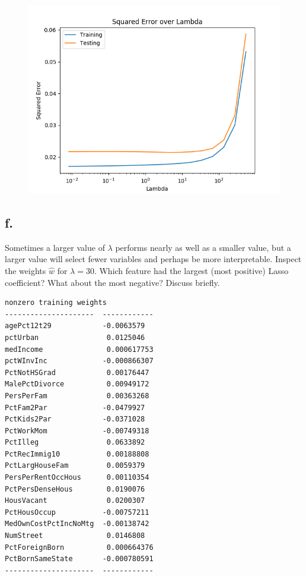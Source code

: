 \documentclass{article}
\newcommand{\1}{\mathbf{1}}
\begin{document}
{\begin{figure}[ht!]
  \centering
  \includegraphics[width=120mm]{../hw2-code/results/a5_e.png}
\end{figure}

\subsection*{f.}

Sometimes a larger value of $\lambda$ performs nearly as well as a smaller value, but a larger value will select fewer variables and perhaps be more interpretable.  Inspect the weights $\hat{w}$ for $\lambda = 30$.  Which feature
had the largest (most positive) Lasso coefficient? What about the most negative? Discuss briefly. \\

\begin{verbatim}
nonzero training weights
---------------------  ------------
agePct12t29            -0.0063579
pctUrban                0.0125046
medIncome               0.000617753
pctWInvInc             -0.000866307
PctNotHSGrad            0.00176447
MalePctDivorce          0.00949172
PersPerFam              0.00363268
PctFam2Par             -0.0479927
PctKids2Par            -0.0371028
PctWorkMom             -0.00749318
PctIlleg                0.0633892
PctRecImmig10           0.00188808
PctLargHouseFam         0.0059379
PersPerRentOccHous      0.00110354
PctPersDenseHous        0.0190076
HousVacant              0.0200307
PctHousOccup           -0.00757211
MedOwnCostPctIncNoMtg  -0.00138742
NumStreet               0.0146808
PctForeignBorn          0.000664376
PctBornSameState       -0.000780591
---------------------  ------------


\end{verbatim}}
\end{document}
